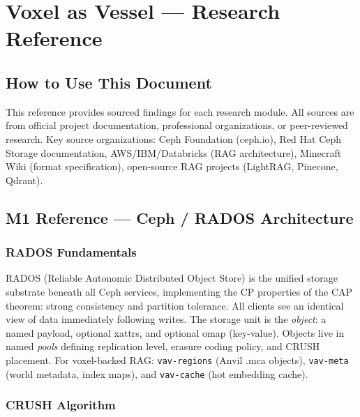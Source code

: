 \documentclass[11pt,letterpaper]{article}
\newcommand{\stageheader}[2]{%
  \noindent\colorbox{#2}{\makebox[\textwidth][l]{%
    \textcolor{white}{\bfseries\sffamily\hspace{6pt}#1\hspace{6pt}}}}%
  \vspace{0.5em}\par%
}
\begin{document}
\newpage

\stageheader{STAGE 2 --- RESEARCH REFERENCE}{secondary}

\section{Voxel as Vessel --- Research Reference}

\subsection{How to Use This Document}

This reference provides sourced findings for each research module. All sources are from official project documentation, professional organizations, or peer-reviewed research. Key source organizations: Ceph Foundation (ceph.io), Red Hat Ceph Storage documentation, AWS/IBM/Databricks (RAG architecture), Minecraft Wiki (format specification), open-source RAG projects (LightRAG, Pinecone, Qdrant).

\subsection{M1 Reference --- Ceph / RADOS Architecture}

\subsubsection{RADOS Fundamentals}

RADOS (Reliable Autonomic Distributed Object Store) is the unified storage substrate beneath all Ceph services, implementing the CP properties of the CAP theorem: strong consistency and partition tolerance. All clients see an identical view of data immediately following writes. The storage unit is the \textit{object}: a named payload, optional xattrs, and optional omap (key-value). Objects live in named \textit{pools} defining replication level, erasure coding policy, and CRUSH placement. For voxel-backed RAG: \texttt{vav-regions} (Anvil .mca objects), \texttt{vav-meta} (world metadata, index maps), and \texttt{vav-cache} (hot embedding cache).

\subsubsection{CRUSH Algorithm}
\end{document}
